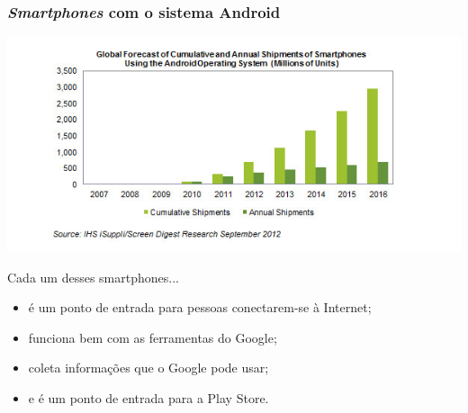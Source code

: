\documentclass[xcolor=dvipsnames]{beamer}
\begin{document}
\begin{frame}
	\frametitle{\textit{Smartphones} com o sistema Android}
 	\includegraphics[scale=0.38]{android.png}
\pause
	{\small 
	\begin{block}{Cada um desses smartphones...}	
	\begin{itemize}
	\item é um ponto de entrada para pessoas conectarem-se à Internet;
	\item funciona bem com as ferramentas do Google;
	\item coleta informações que o Google pode usar;
	\item e é um ponto de entrada para a Play Store.
	\end{itemize}
	\end{block}
	}
\end{frame}
\end{document}
